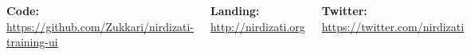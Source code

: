 \documentclass[24pt, a0paper, landscape]{tikzposter}
\begin{document}
\begin{columns}
{        \bigbreak
        \textbf{Code:} \href{https://github.com/Zukkari/nirdizati-training-ui}{\url{https://github.com/Zukkari/nirdizati-training-ui}}
        
        \bigbreak
        \textbf{Landing:} \href{http://nirdizati.org/}{\url{http://nirdizati.org}}
        
        \bigbreak

        \textbf{Twitter:} \href{https://twitter.com/nirdizati}{\url{https://twitter.com/nirdizati}}
        }

        \block{}
        {
        \begin{tikzfigure}
            \includegraphics[scale=0.9]{figures/unilogo.jpg}
        \end{tikzfigure}
        }

    \end{columns}
\end{document}
